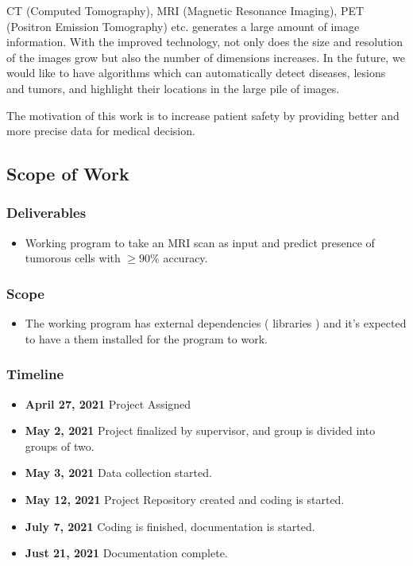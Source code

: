 \documentclass[11pt]{article}
\begin{document}
	CT (Computed Tomography), MRI (Magnetic Resonance Imaging), PET (Positron
	Emission Tomography) etc. generates a large amount of image information.
	With the improved technology, not only does the size and resolution of the
	images grow but also the number of dimensions increases. In the future, we
	would like to have algorithms which can automatically detect diseases,
	lesions and tumors, and highlight their locations in the large pile of
	images.

	The motivation of this work is to increase patient safety by providing
	better and more precise data for medical decision.

	\subsection[scope of work]{Scope of Work}
	\subsubsection[deliverables]{Deliverables}
	\begin{itemize}
		\item Working program to take an MRI scan as input and predict presence
			of tumorous cells with $\geq 90\%$ accuracy.
	\end{itemize}

	\subsubsection[scope]{Scope}
	\begin{itemize}
		\item The working program has external dependencies ( libraries ) and
			it's expected to have a them installed for the program to work.
	\end{itemize}

	\subsubsection[timeline]{Timeline}
	\begin{itemize}
		\item \textbf{April 27, 2021} Project Assigned
		\item \textbf{May 2, 2021} Project finalized by supervisor, and group is
			divided into groups of two.
		\item \textbf{May 3, 2021} Data collection started.
		\item \textbf{May 12, 2021} Project Repository created and coding is
			started.
		\item \textbf{July 7, 2021} Coding is finished, documentation is
			started.
		\item \textbf{Just 21, 2021} Documentation complete.
	\end{itemize}
\end{document}
